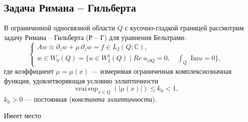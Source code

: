 \subsection{Задача Римана -- Гильберта}

В ограниченной односвязной области $Q$ с кусочно-гладкой границей рассмотрим задачу Римана -- Гильберта (Р -- Г) для уравнения Бельтрами:
\begin{equation}\label{smm-f:1.001}
	\left\{\begin{array}{l}
		A w\equiv\partial_{\bar{z}}w+\mu\,\partial_z w=f\in L_2(Q;\mathbb{C}), \\[3mm]
		w\in W_0(Q)=\{u\in W_2^1(Q) \mid { Re\ u}_{|\partial Q}=0,\quad \int_Q\text{ Im} u=0\},
	\end{array}\right.
\end{equation}
где коэффициент $\mu=\mu(x)$ --- измеримая ограниченная комплекснозначная функция, удовлетворяющая условию эллиптичности
\begin{equation}\label{smm-f:1.2}
	\mathop{vrai\,sup}_{x\in Q}\left(|\mu(x)|\right)\leqslant k_0 <1,
\end{equation}
$k_0>0$ --- постоянная (\textit{константа эллиптичности}).

Имеет место


